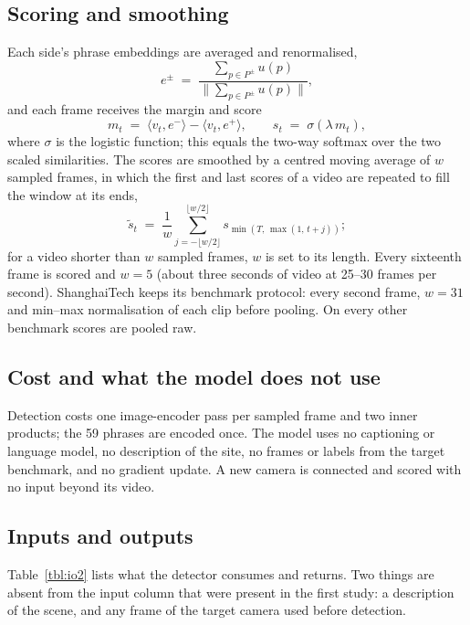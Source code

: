 \documentclass[a4paper,fleqn]{cas-sc}
\begin{document}
\subsection{Scoring and smoothing}
Each side's phrase embeddings are averaged and renormalised,
\begin{equation}
e^{\pm} \;=\; \frac{\sum_{p\in P^{\pm}} u(p)}{\big\|\sum_{p\in P^{\pm}} u(p)\big\|},
\label{eq:proto}
\end{equation}
and each frame receives the margin and score
\begin{equation}
m_t \;=\; \langle v_t, e^{-}\rangle - \langle v_t, e^{+}\rangle, \qquad
s_t \;=\; \sigma(\lambda\, m_t),
\label{eq:margin}
\end{equation}
where $\sigma$ is the logistic function; this equals the two-way softmax over the two
scaled similarities. The scores are smoothed by a centred moving average of $w$
sampled frames, in which the first and last scores of a video are repeated to fill the
window at its ends,
\begin{equation}
\tilde{s}_t \;=\; \frac{1}{w}\sum_{j=-\lfloor w/2\rfloor}^{\lfloor w/2\rfloor}
s_{\min(T,\,\max(1,\,t+j))};
\label{eq:smooth2}
\end{equation}
for a video shorter than $w$ sampled frames, $w$ is set to its length.
Every sixteenth frame is scored and $w=5$ (about three seconds of video at 25--30
frames per second). ShanghaiTech keeps its benchmark protocol: every second frame,
$w=31$ and min--max normalisation of each clip before pooling. On every other
benchmark scores are pooled raw.

\subsection{Cost and what the model does not use}
Detection costs one image-encoder pass per sampled frame and two inner products; the
59 phrases are encoded once. The model uses no captioning or language model, no
description of the site, no frames or labels from the target benchmark, and no
gradient update. A new camera is connected and scored with no input beyond its video.

\subsection{Inputs and outputs}
\label{sec:io2}
Table~\ref{tbl:io2} lists what the detector consumes and returns. Two things are
absent from the input column that were present in the first study: a description of the
scene, and any frame of the target camera used before detection.
\end{document}
